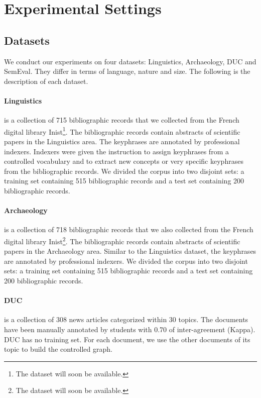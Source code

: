 \section{Experimental Settings}
\label{sec:experimental_settings}
  \subsection{Datasets}
  \label{subsec:datasets}
    We conduct our experiments on four datasets: Linguistics, Archaeology, DUC
    and SemEval. They differ in terms of language, nature and size. The following
    is the description of each dataset.

    \paragraph{Linguistics} is a collection of 715 bibliographic records that we
    collected from the French digital library Inist\footnote{The dataset will
    soon be available.}. The bibliographic records
    contain abstracts of scientific papers in the Linguistics area. The
    keyphrases are annotated by professional indexers. Indexers were
    given the instruction to assign keyphrases from a controlled vocabulary and to extract new
    concepts or very specific keyphrases from the bibliographic records. We divided the
    corpus into two disjoint sets: a training set containing 515 bibliographic
    records and a test set containing 200 bibliographic records.
    
    \paragraph{Archaeology} is a collection of 718 bibliographic records that we
    also collected from the French digital library Inist\footnote{The dataset will
    soon be available.}. The bibliographic records
    contain abstracts of scientific papers in the Archaeology area. Similar to
    the Linguistics dataset, the keyphrases are annotated by professional
    indexers. We divided the corpus into two disjoint sets: a training set
    containing 515 bibliographic records and a test set containing 200
    bibliographic records.

    \paragraph{DUC~\textnormal{\cite{wan2008expandrank}}} is a collection of 308
    news articles categorized within 30 topics. The documents have been manually
    annotated by students with 0.70 of inter-agreement (Kappa). DUC has no
    training set. For each document, we use the other
    documents of its topic to build the controlled graph.

